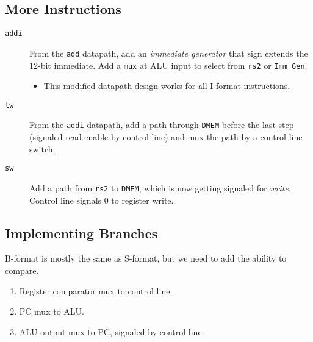 \subsection{More Instructions}
\begin{description}
\item [\texttt{addi}]
From the \texttt{add} datapath, add an \emph{immediate generator} that sign extends the 12-bit immediate. Add a \texttt{mux} at ALU input to select from \texttt{rs2} or \texttt{Imm Gen}.
\begin{itemize}
    \item This modified datapath design works for all I-format instructions.
\end{itemize}

\item[\texttt{lw}]
From the \texttt{addi} datapath, add a path through \texttt{DMEM} before the last step (signaled read-enable by control line) and mux the path by a control line switch.

\item[\texttt{sw}]
Add a path from \texttt{rs2} to \texttt{DMEM}, which is now getting signaled for \emph{write}. Control line signals 0 to register write.
\end{description}

\subsection{Implementing Branches}
B-format is mostly the same as S-format, but we need to add the ability to compare.
\begin{enumerate}
	\item Register comparator mux to control line.
	\item PC mux to ALU.
	\item ALU output mux to PC, signaled by control line.
\end{enumerate}